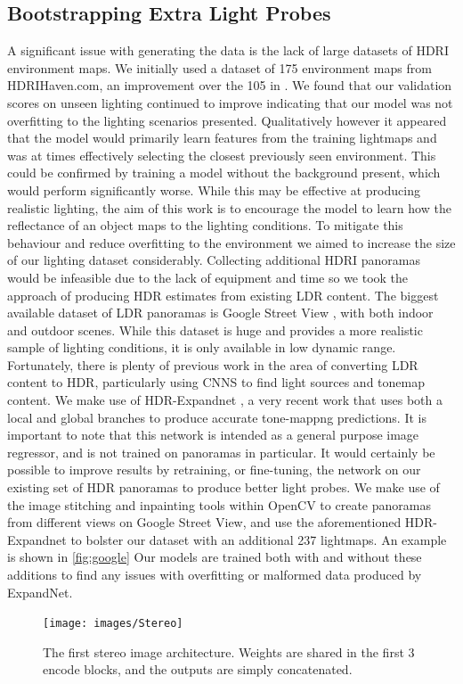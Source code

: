 \documentclass[ %
                    author={Gavin Parker},
                supervisor={Dr. Neill Campbell},
                    degree={MEng},
                     title={Deep Siamese Networks for Illumination Estimation from Stereo Images},
                  subtitle={},
                      type={Research},
                      year={2018} ]{dissertation}
\begin{document}
\subsection{Bootstrapping Extra Light Probes}
A significant issue with generating the data is the lack of large datasets of HDRI environment maps. We initially used a dataset of 175 environment maps from HDRIHaven.com, an improvement over the 105 in \cite{RematasCVPR2016}. We found that our validation scores on unseen lighting continued to improve indicating that our model was not overfitting to the lighting scenarios presented. Qualitatively however it appeared that the model would primarily learn features from the training lightmaps and was at times effectively selecting the closest previously seen environment. This could be confirmed by training a model without the background present, which would perform significantly worse. While this may be effective at producing realistic lighting, the aim of this work is to encourage the model to learn how the reflectance of an object maps to the lighting conditions. To mitigate this behaviour and reduce overfitting to the environment we aimed to increase the size of our lighting dataset considerably. 
\newline
Collecting additional HDRI panoramas would be infeasible due to the lack of equipment and time so we took the approach of producing HDR estimates from existing LDR content. The biggest available dataset of LDR panoramas is Google Street View \cite{GoogleMaps}, with both indoor and outdoor scenes. While this dataset is huge and provides a more realistic sample of lighting conditions, it is only available in low dynamic range. Fortunately, there is plenty of previous work in the area of converting LDR content to HDR, particularly using CNNS to find light sources and tonemap content. We make use of HDR-Expandnet \cite{2018arXiv180302266M}, a very recent work that uses both a local and global branches to produce accurate tone-mappng predictions. It is important to note that this network is intended as a general purpose image regressor, and is not trained on panoramas in particular. It would certainly be possible to improve results by retraining, or fine-tuning, the network on our existing set of HDR panoramas to produce better light probes. We make use of the image stitching and inpainting tools within OpenCV to create panoramas from different views on Google Street View, and use the aforementioned HDR-Expandnet to bolster our dataset with an additional 237 lightmaps. An example is shown in \ref{fig:google} Our models are trained both with and without these additions to find any issues with overfitting or malformed data produced by ExpandNet.
\begin{figure}[H]
\centering
\texttt{[image: images/Stereo]}
\caption 
\newline
The first stereo image architecture. Weights are shared in the first 3 encode blocks, and the outputs are simply concatenated.
\label{basic}
\end{figure}
\end{document}
